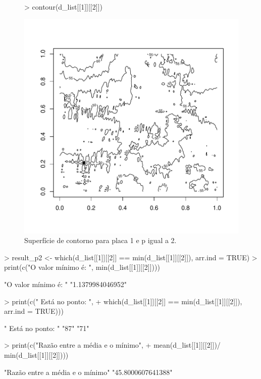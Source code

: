 \documentclass[12pt]{article}
\begin{document}
\begin{figure}
 \centering
\begin{Schunk}
\begin{Sinput}
>  contour(d_list[[1]][[2]])
\end{Sinput}
\end{Schunk}
\includegraphics{template_matching-007}
 \caption{Superfície de contorno para placa 1 e p igual a 2.}
 \label{placa1p2}
\end{figure}
\begin{Schunk}
\begin{Sinput}
>  result_p2 <- which(d_list[[1]][[2]] == min(d_list[[1]][[2]]), arr.ind = TRUE)
>  print(c("O valor mínimo é: ",  min(d_list[[1]][[2]])))
\end{Sinput}
\begin{Soutput}
[1] "O valor mínimo é: " "1.1379984046952"   
\end{Soutput}
\begin{Sinput}
>  print(c(" Está no ponto: ",
+          which(d_list[[1]][[2]] == min(d_list[[1]][[2]]), arr.ind = TRUE)))
\end{Sinput}
\begin{Soutput}
[1] " Está no ponto: " "87"               "71"              
\end{Soutput}
\begin{Sinput}
> print(c("Razão entre a média e o mínimo", 
+         mean(d_list[[1]][[2]])/ min(d_list[[1]][[2]])))
\end{Sinput}
\begin{Soutput}
[1] "Razão entre a média e o mínimo" "45.8000607641388"              
\end{Soutput}
\end{Schunk}
\end{document}
